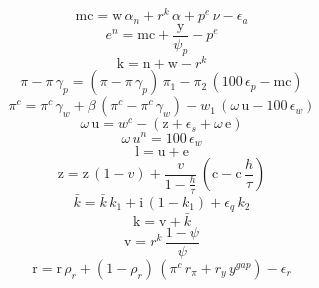 \begin{dmath}
{{\mathrm{mc}}}={{\mathrm{w}}}\, {{\alpha_{n}}}+{{r^{k}}}\, {{\alpha}}+{{p^{e}}}\, {{\nu}}-{{\epsilon_{a}}}
\end{dmath}
\begin{dmath}
{{e^{n}}}={{\mathrm{mc}}}+\frac{{{\mathrm{y}}}}{{{\psi_{p}}}}-{{p^{e}}}
\end{dmath}
\begin{dmath}
{{\mathrm{k}}}={{\mathrm{n}}}+{{\mathrm{w}}}-{{r^{k}}}
\end{dmath}
\begin{dmath}
{{\pi}}-{{\pi}}\, {{\gamma_{p}}}=\left({{\pi}}-{{\pi}}\, {{\gamma_{p}}}\right)\, {{\pi_{1}}}-{{\pi_{2}}}\, \left(100\, {{\epsilon_{p}}}-{{\mathrm{mc}}}\right)
\end{dmath}
\begin{dmath}
{{\pi^{c}}}={{\pi^{c}}}\, {{\gamma_{w}}}+{{\beta}}\, \left({{\pi^{c}}}-{{\pi^{c}}}\, {{\gamma_{w}}}\right)-{{w_{1}}}\, \left({{\omega}}\, {{\mathrm{u}}}-100\, {{\epsilon_{w}}}\right)
\end{dmath}
\begin{dmath}
{{\omega}}\, {{\mathrm{u}}}={{w^{c}}}-\left({{\mathrm{z}}}+{{\epsilon_{s}}}+{{\omega}}\, {{\mathrm{e}}}\right)
\end{dmath}
\begin{dmath}
{{\omega}}\, {{u^{n}}}=100\, {{\epsilon_{w}}}
\end{dmath}
\begin{dmath}
{{\mathrm{l}}}={{\mathrm{u}}}+{{\mathrm{e}}}
\end{dmath}
\begin{dmath}
{{\mathrm{z}}}={{\mathrm{z}}}\, \left(1-{{v}}\right)+\frac{{{v}}}{1-\frac{{{h}}}{{{\tau}}}}\, \left({{\mathrm{c}}}-{{\mathrm{c}}}\, \frac{{{h}}}{{{\tau}}}\right)
\end{dmath}
\begin{dmath}
{{\bar{k}}}={{\bar{k}}}\, {{k_{1}}}+{{\mathrm{i}}}\, \left(1-{{k_{1}}}\right)+{{\epsilon_{q}}}\, {{k_{2}}}
\end{dmath}
\begin{dmath}
{{\mathrm{k}}}={{\mathrm{v}}}+{{\bar{k}}}
\end{dmath}
\begin{dmath}
{{\mathrm{v}}}={{r^{k}}}\, \frac{1-{{\psi}}}{{{\psi}}}
\end{dmath}
\begin{dmath}
{{\mathrm{r}}}={{\mathrm{r}}}\, {{\rho_{r}}}+\left(1-{{\rho_{r}}}\right)\, \left({{\pi^{c}}}\, {{r_{\pi}}}+{{r_{y}}}\, {{y^{gap}}}\right)-{{\epsilon_{r}}}
\end{dmath}
